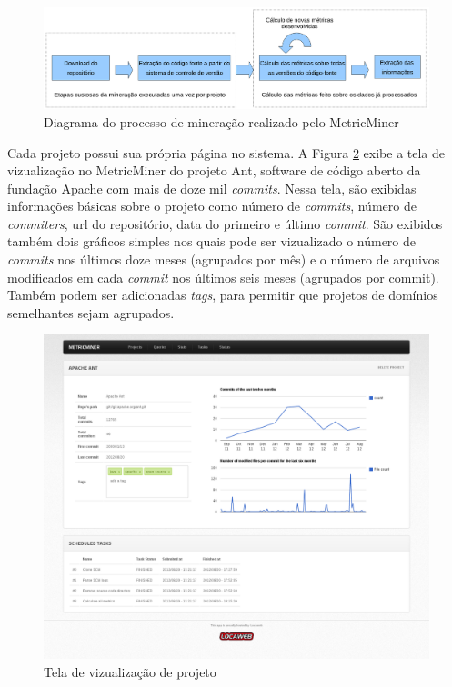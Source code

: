 \documentclass[a4paper, 12pt, twoside]{book}
\begin{document}
        \begin{figure}[ht]
            \centering
            \includegraphics[width=1.0\textwidth]{img/diagrama.png}
            \caption{Diagrama do processo de mineração realizado pelo MetricMiner}
            \label{fig:diagrama}
        \end{figure}

        Cada projeto possui sua própria página no sistema. A Figura \ref{fig:screen_projeto} exibe a 
        tela de vizualização no MetricMiner do projeto Ant, software de código aberto da fundação     
        Apache com mais de doze mil \textit{commits}. Nessa tela, são exibidas informações básicas 
        sobre o projeto como número de \textit{commits}, número de \textit{commiters}, url do 
        repositório, data do primeiro e último \textit{commit}. São exibidos também dois gráficos 
        simples nos quais pode ser vizualizado o número de \textit{commits} nos últimos doze meses 
        (agrupados por mês) e o número de arquivos modificados em cada \textit{commit} nos últimos 
        seis meses (agrupados por commit). Também podem ser adicionadas \textit{tags},
        para permitir que projetos de domínios semelhantes sejam agrupados.
    
        \begin{figure}[ht]
            \centering
            \includegraphics[width=1.00\textwidth]{img/ant.png}
            \caption{Tela de vizualização de projeto}
            \label{fig:screen_projeto}
        \end{figure}
\end{document}
